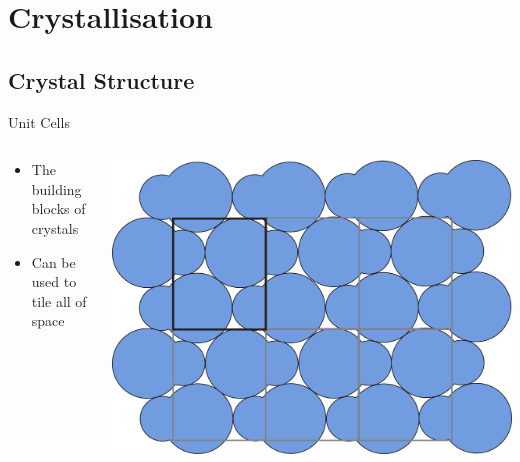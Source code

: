 \documentclass[16pt, aspectratio=43,compress]{beamer}
\begin{document}
\begin{frame}{Structural Rigidity}
    \centering
    \texttt{[image: \{\{DW.D]}}}
\end{frame}

\section{Crystallisation}

\subsection{Crystal Structure}

\begin{frame}{Unit Cells}
    \begin{columns}
        \begin{column}{0.5\linewidth}
            \begin{itemize}
                \item The building blocks of crystals
                \item Can be used to tile all of space
            \end{itemize}
        \end{column}
        \begin{column}{0.5\linewidth}
            \includegraphics[width=\textwidth]{unit_cell}
        \end{column}
    \end{columns}
\end{frame}
\end{document}

